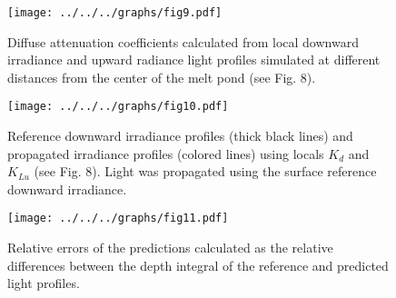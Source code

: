 \documentclass[12pt,a4paper]{scrartcl}
\newcommand{\ked}{\ensuremath{K_{d}}}
\newcommand{\klu}{\ensuremath{K_{Lu}}}
\begin{document}
\begin{figure}[ht]
	\centering
	\texttt{[image: ../../../graphs/fig9.pdf]}
	\caption{Diffuse attenuation coefficients calculated from local downward irradiance and upward radiance light profiles simulated at different distances from the center of the melt pond (see Fig. 8).}
\end{figure}

\clearpage
\newpage

\begin{figure}[ht]
	\centering
	\texttt{[image: ../../../graphs/fig10.pdf]}
	\caption{Reference downward irradiance profiles (thick black lines) and propagated irradiance profiles (colored lines) using locals \ked{} and \klu{} (see Fig. 8). Light was propagated using the surface reference downward irradiance.}
\end{figure}

\clearpage
\newpage

\begin{figure}[ht]
	\centering
	\texttt{[image: ../../../graphs/fig11.pdf]}
	\caption{Relative errors of the predictions calculated as the relative differences between the depth integral of the reference and predicted light profiles.}
\end{figure}
\end{document}
